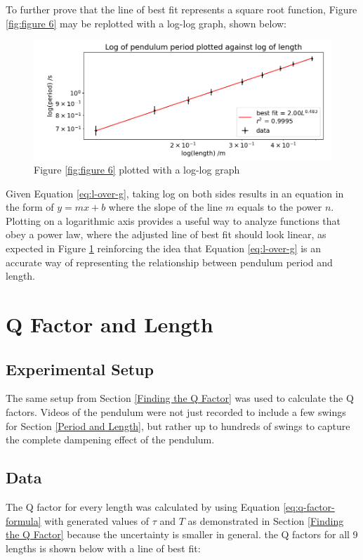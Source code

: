 \documentclass[11pt]{article}
\begin{document}
\begin{multicols}{2}
{To further prove that the line of best fit represents a square root function, Figure \ref{fig:figure 6} may be replotted with a log-log graph, shown below:

\begin{figure}[H]
    \centering
    \includegraphics[width=\linewidth]{../figures/period_vs_length_log.png}
    \caption[]{Figure \ref{fig:figure 6} plotted with a log-log graph}
    \label{fig:figure 7}
\end{figure}

Given Equation \ref{eq:l-over-g}, taking log on both sides results in an equation in the form of $y = mx + b$ where the slope of the line $m$ equals to the power $n$. Plotting on a logarithmic axis provides a useful way to analyze functions that obey a power law, where the adjusted line of best fit should look linear, as expected in Figure \ref{fig:figure 7} reinforcing the idea that Equation \ref{eq:l-over-g} is an accurate way of representing the relationship between pendulum period and length.

\section{Q Factor and Length}

\subsection{Experimental Setup}
The same setup from Section \ref{Finding the Q Factor} was used to calculate the Q factors. Videos of the pendulum were not just recorded to include a few swings for Section \ref{Period and Length}, but rather up to hundreds of swings to capture the complete dampening effect of the pendulum.

\subsection{Data}
The Q factor for every length was calculated by using Equation \ref{eq:q-factor-formula} with generated values of $\tau$ and $T$ as demonstrated in Section \ref{Finding the Q Factor} because the uncertainty is smaller in general. the Q factors for all 9 lengths is shown below with a line of best fit:

}
\end{multicols}
\end{document}
